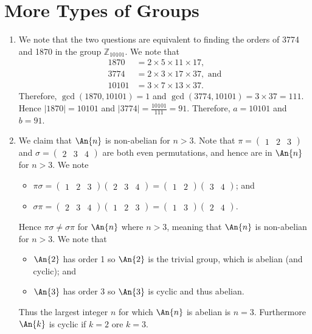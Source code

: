 \section{More Types of Groups}
\begin{enumerate}    
    \item We note that the two questions are equivalent to finding the orders of 3774 and 1870 in the group $\mathbb{Z}_{10101}$. We note that
    \begin{align*}
        1870 &= 2 \times 5 \times 11 \times 17,\\
        3774 &= 2 \times 3 \times 17 \times 37, \text{ and}\\
        10101 &= 3 \times 7 \times 13 \times 37.
    \end{align*}
    Therefore, $\gcd(1870, 10101) = 1$ and $\gcd(3774, 10101) = 3 \times 37 = 111$. Hence $|1870| = 10101$ and $|3774| = \frac{10101}{111} = 91$. Therefore, $a = 10101$ and $b = 91$.

    \item We claim that $\An{n}$ is non-abelian for $n > 3$. Note that $\pi = \begin{pmatrix}1 & 2 & 3\end{pmatrix}$ and $\sigma = \begin{pmatrix}2 & 3 & 4\end{pmatrix}$ are both even permutations, and hence are in $\An{n}$ for $n > 3$. We note
    \begin{itemize}
        \item $\pi\sigma = \begin{pmatrix}1 & 2 & 3\end{pmatrix}\begin{pmatrix}2 & 3 & 4\end{pmatrix} = \begin{pmatrix}1 & 2\end{pmatrix}\begin{pmatrix}3 & 4\end{pmatrix}$; and
        \item $\sigma\pi = \begin{pmatrix}2 & 3 & 4\end{pmatrix}\begin{pmatrix}1 & 2 & 3\end{pmatrix} = \begin{pmatrix}1 & 3\end{pmatrix}\begin{pmatrix}2 & 4\end{pmatrix}$.
    \end{itemize}
    Hence $\pi\sigma \neq \sigma\pi$ for $\An{n}$ where $n > 3$, meaning that $\An{n}$ is non-abelian for $n > 3$. We note that
    \begin{itemize}
        \item $\An{2}$ has order 1 so $\An{2}$ is the trivial group, which is abelian (and cyclic); and
        \item $\An{3}$ has order 3 so $\An{3}$ is cyclic and thus abelian.
    \end{itemize}
    Thus the largest integer $n$ for which $\An{n}$ is abelian is $n = 3$. Furthermore $\An{k}$ is cyclic if $k = 2$ ore $k = 3$.
    

\end{enumerate}
